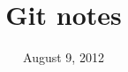 \documentclass[12pt]{report}
\begin{document}
\title{Git notes}

\author{}

\date{August 9, 2012}

\maketitle

\tableofcontents









\end{document}
